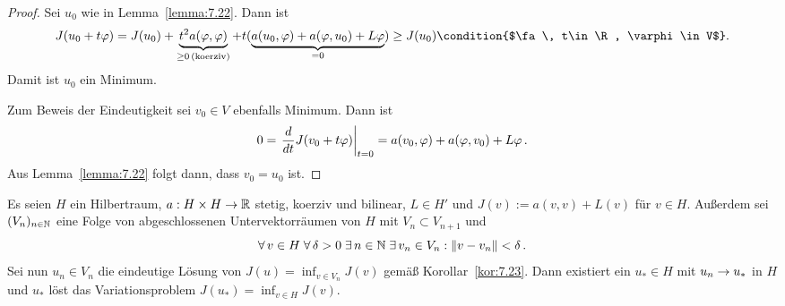 \begin{proof}
  Sei $u_0$ wie in Lemma~\ref{lemma:7.22}. Dann ist
  \begin{dmath*}
    J(u_0+t\varphi)=J(u_0)+\underbrace{t^2 a(\varphi,\varphi)}_{\geq0 \, \text{(koerziv)}}
    +t(\underbrace{a(u_0,\varphi)+a(\varphi,u_0)+L\varphi}_{=0})
    \geq J(u_0)
    \condition{$\fa\,  t\in\R, \varphi\in V$} .
  \end{dmath*}
  Damit ist $u_0$ ein Minimum.

  Zum Beweis der Eindeutigkeit sei $v_0\in V$ ebenfalls Minimum. Dann ist
  \[ 
  0=\left.\frac{d}{d t}J(v_0+t\varphi)\right\vert_{t=0}
  =a(v_0,\varphi)+a(\varphi,v_0)+L\varphi\, .
  \]
  Aus Lemma~\ref{lemma:7.22} folgt dann, dass $v_0=u_0$ ist.
\end{proof}

\begin{theorem}
  \label{theorem:7.24} Es seien $H$ ein Hilbertraum, $a:H\times H\rightarrow\mathbb{R}$ stetig, koerziv und bilinear, $L\in H'$ und $J(v):=a(v,v)+L(v)$ für $v\in H$. Außerdem sei $(V_n)_{n\in\mathbb{N}}$ eine Folge von abgeschlossenen Untervektorräumen von $H$ mit $V_n\subset V_{n+1}$ und
  \[ \forall \, v\in H\;\forall\, \delta>0\;\exists\,  n\in\mathbb{N}\;\exists\,  v_n\in V_n:\lVert v-v_n\rVert<\delta\, . \]
  Sei nun $u_n\in V_n$ die eindeutige Lösung von $J(u)=\inf_{v\in V_n}J(v)$ gemäß Korollar~\ref{kor:7.23}. Dann existiert ein $u_*\in H$ mit $u_n\rightarrow u_*$ in $H$ und $u_*$ löst das Variationsproblem $J(u_*)=\inf_{v\in H}J(v)$.
\end{theorem}

